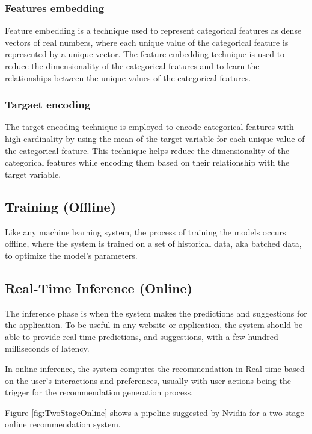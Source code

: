 \subsubsection{Features embedding}
Feature embedding is a technique used to represent categorical features as dense vectors of real numbers, where each unique value of the categorical feature is represented by a unique vector. The feature embedding technique is used to reduce the dimensionality of the categorical features and to learn the relationships between the unique values of the categorical features.\cite{FeatureEmbedding}
\subsubsection{Targaet encoding}
The target encoding technique is employed to encode categorical features with high cardinality by using the mean of the target variable for each unique value of the categorical feature. This technique helps reduce the dimensionality of the categorical features while encoding them based on their relationship with the target variable.\cite{TargetEncoding}
\subsection{Training (Offline)}
Like any machine learning system, the process of training the models occurs offline,
where the system is trained on a set of historical data, aka batched data, to optimize the model's parameters.


\subsection{Real-Time Inference (Online)}
The inference phase is when the system makes the predictions and suggestions for the application.
To be useful in any website or application, 
the system should be able to provide real-time predictions, 
and suggestions, with a few hundred milliseconds of latency.

In online inference, the system computes the recommendation in Real-time based on the user's interactions and preferences, 
usually with user actions being the trigger for the recommendation generation process.

Figure \ref{fig:TwoStageOnline} shows a pipeline suggested by Nvidia\cite{NvidiaOfflineToOnline} for a two-stage online recommendation system.

